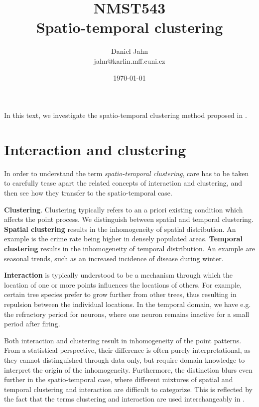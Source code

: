 \documentclass{article}
\begin{document}
\title{NMST543 \\
Spatio-temporal clustering}
\author{Daniel Jahn \\
jahn@karlin.mff.cuni.cz}  
\date{\today} 
\maketitle

\tableofcontents


In this text, we investigate the spatio-temporal clustering method proposed in \cite{diggle1995}.

\section{Interaction and clustering}
In order to understand the term \textit{spatio-temporal clustering}, care has to be taken to carefully tease apart the related concepts of interaction and clustering, and then see how they transfer to the spatio-temporal case.


\textbf{Clustering}. Clustering typically refers to an a priori existing condition which affects the point process. We distinguish between spatial and temporal clustering. \textbf{Spatial clustering} results in the inhomogeneity of spatial distribution. An example is the crime rate being higher in densely populated areas. 
\textbf{Temporal clustering} results in the inhomogeneity of temporal distribution. An example are seasonal trends, such as an increased incidence of disease during winter. 
 
\textbf{Interaction} is typically understood to be a mechanism through which the location of one or more points influences the locations of others. For example, certain tree species prefer to grow further from other trees, thus resulting in repulsion between the individual locations. In the temporal domain, we have e.g. the refractory period for neurons, where one neuron remains inactive for a small period after firing. 

Both interaction and clustering result in inhomogeneity of the point patterns. From a statistical perspective, their difference is often purely interpretational, as they cannot distinguished through data only, but require domain knowledge to interpret the origin of the inhomogeneity. Furthermore, the distinction blurs even further in the spatio-temporal case, where different mixtures of spatial and temporal clustering and interaction are difficult to categorize. 
This is reflected by the fact that the terms clustering and interaction are used interchangeably in \cite{diggle1995}.
\end{document}
